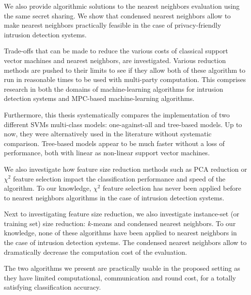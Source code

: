 We also provide algorithmic solutions to the nearest neighbors evaluation using the same secret sharing. We show that condensed nearest neighbors allow to make nearest neighbors practically feasible in the case of privacy-friendly intrusion detection systems.

Trade-offs that can be made to reduce the various costs of classical support vector machines and nearest neighbors, are investigated. Various reduction methods are pushed to their limits to see if they allow both of these algorithm to run in reasonable times to be used with multi-party computation. This comprises research in both the domains of machine-learning algorithms for intrusion detection systems and MPC-based machine-learning algorithms.

Furthermore, this thesis systematically compares the implementation of two different SVMs multi-class models: one-against-all and tree-based models. Up to now, they were alternatively used in the literature without systematic comparison. Tree-based models appear to be much faster without a loss of performance, both with linear as non-linear support vector machines.

We also investigate how feature size reduction methods such as PCA reduction or $\chi^2$ feature selection impact the classification performance and speed of the algorithm. To our knowledge, $\chi^2$ feature selection has never been applied before to nearest neighbors algorithms in the case of intrusion detection systems.

Next to investigating feature size reduction, we also investigate instance-set (or training set) size reduction: $k$-means and condensed nearest neighbors. To our knowledge, none of these algorithms have been applied to nearest neighbors in the case of intrusion detection systems. The condensed nearest neighbors allow to dramatically decrease the computation cost of the evaluation.

The two algorithms we present are practically usable in the proposed setting as they have limited computational, communication and round cost, for a totally satisfying classification accuracy.